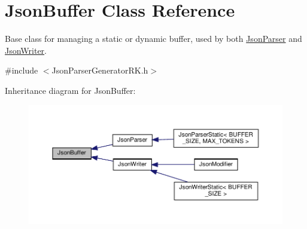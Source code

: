 \hypertarget{class_json_buffer}{}\section{Json\+Buffer Class Reference}
\label{class_json_buffer}


Base class for managing a static or dynamic buffer, used by both \hyperlink{class_json_parser}{Json\+Parser} and \hyperlink{class_json_writer}{Json\+Writer}.  




{\ttfamily \#include $<$Json\+Parser\+Generator\+R\+K.\+h$>$}



Inheritance diagram for Json\+Buffer\+:\nopagebreak
\begin{figure}[H]
\begin{center}
\leavevmode
\includegraphics[width=350pt]{class_json_buffer__inherit__graph}
\end{center}
\end{figure}

